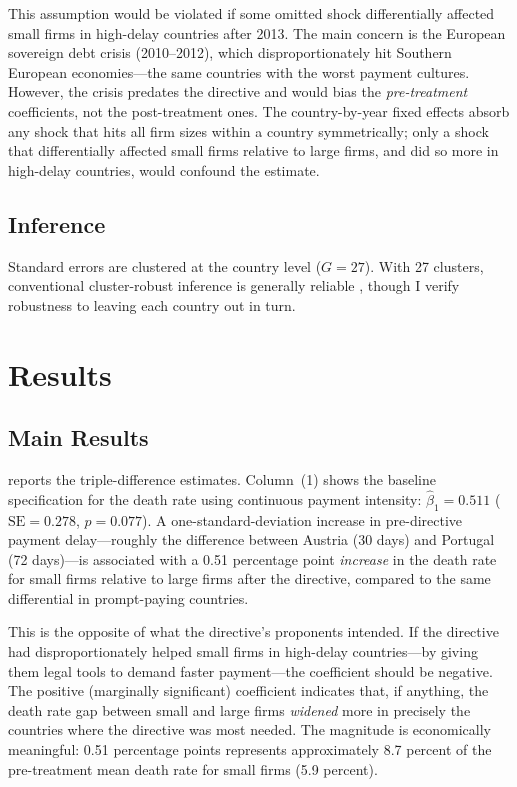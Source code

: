 \documentclass[12pt]{article}
\begin{document}
This assumption would be violated if some omitted shock differentially affected small firms in high-delay countries after 2013. The main concern is the European sovereign debt crisis (2010--2012), which disproportionately hit Southern European economies---the same countries with the worst payment cultures. However, the crisis predates the directive and would bias the \emph{pre-treatment} coefficients, not the post-treatment ones. The country-by-year fixed effects absorb any shock that hits all firm sizes within a country symmetrically; only a shock that differentially affected small firms relative to large firms, and did so more in high-delay countries, would confound the estimate.

\subsection{Inference}

Standard errors are clustered at the country level ($G = 27$). With 27 clusters, conventional cluster-robust inference is generally reliable \citep{Cameron2008}, though I verify robustness to leaving each country out in turn.


\section{Results}
\label{sec:results}

\subsection{Main Results}

 reports the triple-difference estimates. Column~(1) shows the baseline specification for the death rate using continuous payment intensity: $\hat{\beta}_1 = 0.511$ ($\text{SE} = 0.278$, $p = 0.077$). A one-standard-deviation increase in pre-directive payment delay---roughly the difference between Austria (30 days) and Portugal (72 days)---is associated with a 0.51 percentage point \emph{increase} in the death rate for small firms relative to large firms after the directive, compared to the same differential in prompt-paying countries.

This is the opposite of what the directive's proponents intended. If the directive had disproportionately helped small firms in high-delay countries---by giving them legal tools to demand faster payment---the coefficient should be negative. The positive (marginally significant) coefficient indicates that, if anything, the death rate gap between small and large firms \emph{widened} more in precisely the countries where the directive was most needed. The magnitude is economically meaningful: 0.51 percentage points represents approximately 8.7 percent of the pre-treatment mean death rate for small firms (5.9 percent).
\end{document}
